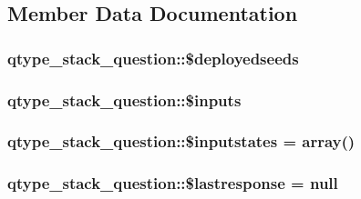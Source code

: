 \subsection{Member Data Documentation}
\hypertarget{classqtype__stack__question_a3d10e7135cb980711af39923d660c6ef}{
\subsubsection[{\$deployedseeds}]{\setlength{\rightskip}{0pt plus 5cm}qtype\_\-stack\_\-question::\$deployedseeds}}
\label{classqtype__stack__question_a3d10e7135cb980711af39923d660c6ef}
\hypertarget{classqtype__stack__question_aea3ef5cc024d400fc7749a480c4c4bd8}{
\subsubsection[{\$inputs}]{\setlength{\rightskip}{0pt plus 5cm}qtype\_\-stack\_\-question::\$inputs}}
\label{classqtype__stack__question_aea3ef5cc024d400fc7749a480c4c4bd8}
\hypertarget{classqtype__stack__question_a7f9ce0d0171e5af1ab6b289ff9a157a3}{
\subsubsection[{\$inputstates}]{\setlength{\rightskip}{0pt plus 5cm}qtype\_\-stack\_\-question::\$inputstates = array()}}
\label{classqtype__stack__question_a7f9ce0d0171e5af1ab6b289ff9a157a3}
\hypertarget{classqtype__stack__question_a3d4f3902b2164b1c39201a2665b06bb9}{
\subsubsection[{\$lastresponse}]{\setlength{\rightskip}{0pt plus 5cm}qtype\_\-stack\_\-question::\$lastresponse = null}}
